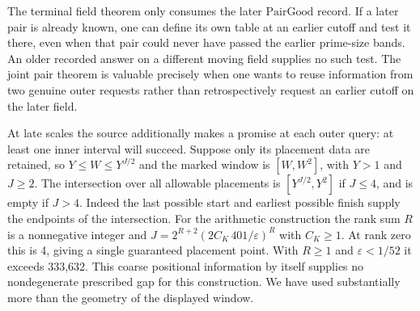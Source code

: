 \documentclass[12pt,letterpaper]{article}
\begin{document}
The terminal field theorem only consumes the later \(\mathrm{PairGood}\) record. If a later pair is already known, one can define its own table at an earlier cutoff and test it there, even when that pair could never have passed the earlier prime-size bands. An older recorded answer on a different moving field supplies no such test. The joint pair theorem is valuable precisely when one wants to reuse information from two genuine outer requests rather than retrospectively request an earlier cutoff on the later field.

At late scales the source additionally makes a promise at each outer query: at least one inner interval will succeed. Suppose only its placement data are retained, so \(Y\le W\le Y^{J/2}\) and the marked window is \([W,W^2]\), with \(Y>1\) and \(J\ge2\). The intersection over all allowable placements is \([Y^{J/2},Y^2]\) if \(J\le4\), and is empty if \(J>4\). Indeed the last possible start and earliest possible finish supply the endpoints of the intersection. For the arithmetic construction the rank sum \(R\) is a nonnegative integer and \(J=2^{R+2}(2C_K\,401/\varepsilon)^R\) with \(C_K\ge1\). At rank zero this is 4, giving a single guaranteed placement point. With \(R\ge1\) and \(\varepsilon<1/52\) it exceeds 333,632. This coarse positional information by itself supplies no nondegenerate prescribed gap for this construction. We have used substantially more than the geometry of the displayed window.
\end{document}
